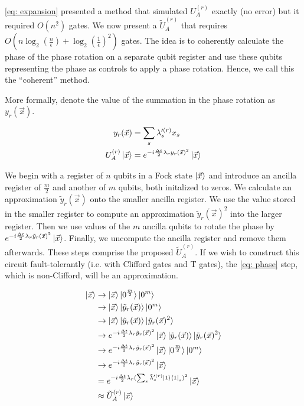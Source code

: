 \eqref{eq: expansion} presented a method that simulated $U_A^{(r)}$ exactly (no error) but it required $O(n^2)$ gates. We now present a $\tilde{U}_A^{(r)}$ that requires $O(n\log_2(\frac{n}{\epsilon}) + \log_2(\frac{1}{\epsilon})^2)$ gates. The idea is to coherently calculate the phase of the phase rotation on a separate qubit register and use these qubits representing the phase as controls to apply a phase rotation. Hence, we call this the ``coherent'' method.

More formally, denote the value of the summation in the phase rotation as $y_r(\vec{x})$.

\begin{equation}
    \begin{split}
        y_r(\vec{x}) &= \sum_s \lambda'^{(r)}_s x_s \\
        U_A^{(r)}\ket{\vec{x}} &= e^{-i\frac{\Delta t}{2}\lambda_ry_r(\vec{x})^2}\ket{\vec{x}}
    \end{split}
\end{equation}

We begin with a register of $n$ qubits in a Fock state $\ket{\vec{x}}$ and introduce an ancilla register of $\frac{m}{2}$ and another of $m$ qubits, both initalized to zeros. We calculate an approximation $\tilde{y}_r(\vec{x})$ onto the smaller ancilla register. We use the value stored in the smaller register to compute an approximation $\tilde{y}_r(\vec{x})^2$ into the larger register. Then we use values of the $m$ ancilla qubits to rotate the phase by $e^{-i\frac{\Delta t}{2}\lambda_r\tilde{y}_r(\vec{x})^2}\ket{\vec{x}}$. Finally, we uncompute the ancilla register and remove them afterwards. These steps comprise the proposed $\tilde{U}_A^{(r)}$. If we wish to construct this circuit fault-tolerantly (i.e. with Clifford gates and T gates), the \eqref{eq: phase} step, which is non-Clifford, will be an approximation. 

\begin{align}
    \ket{\vec{x}} &\rightarrow \ket{\vec{x}}\ket{0^{\frac{m}{2}}}\ket{0^m} \\
    &\rightarrow \ket{\vec{x}}\ket{\tilde{y}_r(\vec{x})}\ket{0^m} \label{eq: summation}\\
    &\rightarrow \ket{\vec{x}}\ket{\tilde{y}_r(\vec{x})}\ket{\tilde{y}_r(\vec{x})^2} \label{eq: squaring} \\
    &\rightarrow e^{-i\frac{\Delta t}{2}\lambda_r\tilde{y}_r(\vec{x})^2}\ket{\vec{x}}\ket{\tilde{y}_r(\vec{x})}\ket{\tilde{y}_r(\vec{x})^2} \label{eq: phase} \\
    &\rightarrow e^{-i\frac{\Delta t}{2}\lambda_r\tilde{y}_r(\vec{x})^2}\ket{\vec{x}}\ket{0^{\frac{m}{2}}}\ket{0^m} \\
    &\rightarrow e^{-i\frac{\Delta t}{2}\lambda_r\tilde{y}_r(\vec{x})^2}\ket{\vec{x}} \\
    &= e^{-i\frac{\Delta t}{2}\lambda_r(\sum_s \tilde{\lambda}'^{(r)}_s \ket{1}\bra{1}_s)^2}\ket{\vec{x}} \\
    &\approx \tilde{U}_A^{(r)}\ket{\vec{x}}
\end{align}

